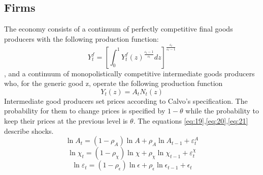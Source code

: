 \documentclass[10pt,a4paper]{article}
\begin{document}
\subsection{Firms}
The economy consists of a continuum of perfectly competitive final goods producers with the following production function:
\begin{equation}
Y_t^f = \left[ \int_{0}^{1} Y_t^f(z)^ \frac{\varepsilon_{t}-1}{\varepsilon_{t}} dz \right]^\frac{\varepsilon_{t}}{\varepsilon_{t}-1}
\end{equation},
and a continuum of monopolistically competitive intermediate goods producers who, for the generic good z, operate the following production function
\begin{equation}
Y_{t}(z) = A_{t}N_{t}(z)
\end{equation}
Intermediate good producers set prices according to Calvo's specification. The probability for them to change prices is specified by $1-\theta$ while the probability to keep their prices at the previous level is $\theta$. The equations \eqref{eq:19},\eqref{eq:20},\eqref{eq:21} describe shocks.
\begin{equation}\label{eq:19}
\ln A_{t}=(1-\rho_{A})\ln A + \rho_{A}\ln A_{t-1} + \varepsilon_{t}^{A}
\end{equation}
\begin{equation}\label{eq:20}
\ln\chi_{t}=(1-\rho_{\chi})\ln \chi + \rho_{\chi}\ln \chi_{t-1} + \varepsilon_{t}^{\chi}
\end{equation}
\begin{equation}\label{eq:21}
\ln\varepsilon_{t}=(1-\rho_{\epsilon})\ln\epsilon + \rho_{\epsilon}\ln \epsilon_{t-1} + \epsilon_{t}
\end{equation}
\end{document}
